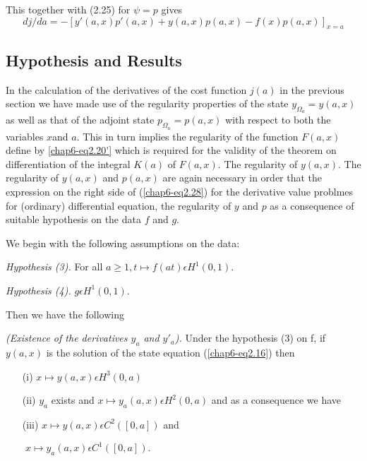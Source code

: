 This together with (2.25) for $\psi = p$ gives
\begin{equation*}
dj/da = -[y'(a, x) p'(a, x) + y(a, x)p(a, x) - f(x) p(a, x) ]_{x=a}\tag{2.28}\label{chap6-eq2.28}
\end{equation*}


\subsection{Hypothesis and Results}\label{chap6-subsec2.4}

In the calculation of the derivatives of the cost function $j(a)$ in
the previous section we have made use of the regularity properties of
the state $y_{\Omega_{a}} = y(a, x)$ as well as that of the adjoint
state $p_{\Omega_{a}} = p(a, x)$ with respect to both the variables
$x$\pageoriginale and $a$. This in turn implies the regularity of the
function $F(a, x)$ define by \ref{chap6-eq2.20'} which is required for
the validity of the theorem on differentiation of the integral $K(a)$
of $F(a, x)$. The regularity of $y(a, x)$. The regularity of $y(a, x)$
and $p(a, x)$ are again necessary in order that the expression on the
right side of (\ref{chap6-eq2.28}) for the derivative value problmes
for (ordinary) differential equation, the regularity of $y$ and $p$ as a
consequence of suitable hypothesis on the data $f$ and $g$. 

We begin with the following assumptions on the data:

{\em Hypothesis (3).} For all $a \geq 1, t \mapsto f(at) \epsilon H^{1} (0, 1)$.

{\em Hypothesis (4).} $g \epsilon H^{1} (0, 1)$.

Then we have the following
\begin{proposition}\label{chap6-prop2.1}
{\em (Existence of the derivatives $y_{a}$ and $y'_{a}$).} Under the hypothesis (3) on f, if $y(a, x)$ is the solution of the state equation (\ref{chap6-eq2.16}) then 
\begin{enumerate}
\item[(i)] $x \mapsto y(a, x) \epsilon H^{3} (0, a)$
\item[(ii)] $y_{a}$ exists and $x \mapsto y_{a} (a, x) \epsilon H^{2} (0, a)$ and as a consequence we have
\item[(iii)] $x \mapsto y(a, x) \epsilon C^{2} ([0, a])$  and
\end{enumerate}
$\qquad x \mapsto y_{a}(a, x) \epsilon C^{1} ([0, a]).$
\end{proposition}

